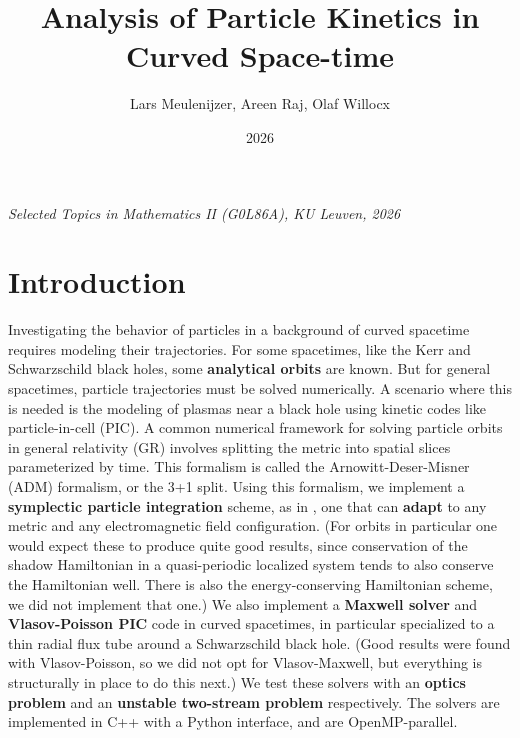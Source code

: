 \documentclass{article}
\begin{document}
\title{Analysis of Particle Kinetics in Curved Space-time}

\author{Lars Meulenijzer, Areen Raj, Olaf Willocx}
\date{2026}

\maketitle

\begin{center} 
\vspace{-15pt}
\Large \textit{Selected Topics in Mathematics II\textnormal{ (G0L86A), KU Leuven, 2026}}
\end{center}


\thispagestyle{empty}
\vspace{20pt}


\section*{Introduction}

Investigating the behavior of particles in a background of curved spacetime requires modeling their trajectories.
For some spacetimes, like the Kerr and Schwarzschild black holes, some \textbf{analytical orbits} are known.
But for general spacetimes, particle trajectories must be solved numerically.
A scenario where this is needed is the modeling of plasmas near a black hole using kinetic codes like particle-in-cell (PIC).
A common numerical framework for solving particle orbits in general relativity (GR) involves splitting the metric into spatial slices parameterized by time.
This formalism is called the Arnowitt-Deser-Misner (ADM) formalism, or the 3+1 split.
Using this formalism, we implement a \textbf{symplectic particle integration} scheme, as in \cite{Bacchini_2018}\cite{Bacchini_2019},
one that can \textbf{adapt} to any metric and any electromagnetic field configuration.
(For orbits in particular one would expect these to produce quite good results, since conservation of the shadow Hamiltonian in a quasi-periodic localized system tends to also conserve the Hamiltonian well. There is also the energy-conserving Hamiltonian scheme, we did not implement that one.)
We also implement a \textbf{Maxwell solver} and \textbf{Vlasov-Poisson PIC} code in curved spacetimes, in particular specialized to a thin radial flux tube around a Schwarzschild black hole.
(Good results were found with Vlasov-Poisson, so we did not opt for Vlasov-Maxwell, but everything is structurally in place to do this next.)
We test these solvers with an \textbf{optics problem} and an \textbf{unstable two-stream problem} respectively.
The solvers are implemented in C++ with a Python interface, and are OpenMP-parallel.
\end{document}
